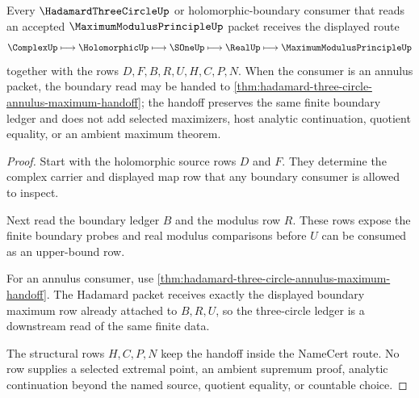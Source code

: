 \begin{theorem}
\label{thm:maximum-modulus-principle-hadamard-boundary-handoff}
Every $\HadamardThreeCircleUp$ or holomorphic-boundary consumer that reads an accepted $\MaximumModulusPrincipleUp$ packet receives the displayed route
$$
\ComplexUp \longmapsto \HolomorphicUp \longmapsto \SOneUp \longmapsto \RealUp \longmapsto \MaximumModulusPrincipleUp
$$
together with the rows $D,F,B,R,U,H,C,P,N$. When the consumer is an annulus packet, the boundary read may be handed to \autoref{thm:hadamard-three-circle-annulus-maximum-handoff}; the handoff preserves the same finite boundary ledger and does not add selected maximizers, host analytic continuation, quotient equality, or an ambient maximum theorem.
\end{theorem}
\begin{proof}
Start with the holomorphic source rows $D$ and $F$. They determine the complex carrier and displayed map row that any boundary consumer is allowed to inspect.

Next read the boundary ledger $B$ and the modulus row $R$. These rows expose the finite boundary probes and real modulus comparisons before $U$ can be consumed as an upper-bound row.

For an annulus consumer, use \autoref{thm:hadamard-three-circle-annulus-maximum-handoff}. The Hadamard packet receives exactly the displayed boundary maximum row already attached to $B,R,U$, so the three-circle ledger is a downstream read of the same finite data.

The structural rows $H,C,P,N$ keep the handoff inside the NameCert route. No row supplies a selected extremal point, an ambient supremum proof, analytic continuation beyond the named source, quotient equality, or countable choice.
\end{proof}



